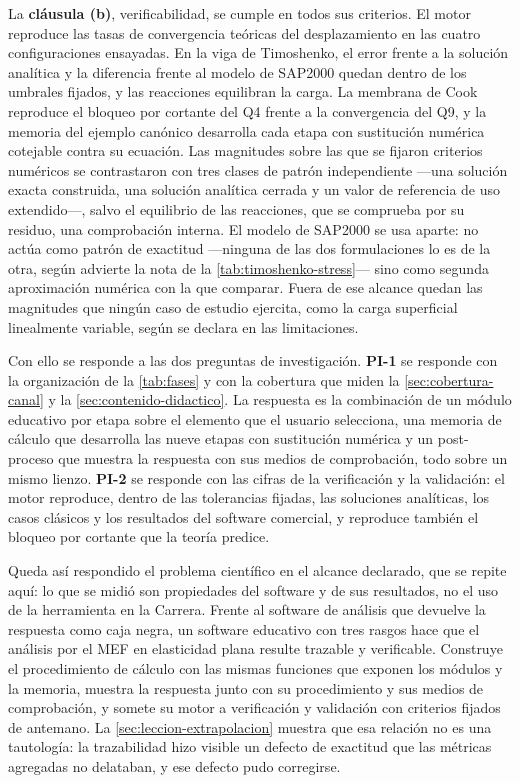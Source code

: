 La \textbf{cláusula (b)}, verificabilidad, se cumple en todos sus criterios. El motor reproduce las tasas de convergencia teóricas del desplazamiento en las cuatro configuraciones ensayadas. En la viga de Timoshenko, el error frente a la solución analítica y la diferencia frente al modelo de SAP2000 quedan dentro de los umbrales fijados, y las reacciones equilibran la carga. La membrana de Cook reproduce el bloqueo por cortante del Q4 frente a la convergencia del Q9, y la memoria del ejemplo canónico desarrolla cada etapa con sustitución numérica cotejable contra su ecuación. Las magnitudes sobre las que se fijaron criterios numéricos se contrastaron con tres clases de patrón independiente ---una solución exacta construida, una solución analítica cerrada y un valor de referencia de uso extendido---, salvo el equilibrio de las reacciones, que se comprueba por su residuo, una comprobación interna. El modelo de SAP2000 se usa aparte: no actúa como patrón de exactitud ---ninguna de las dos formulaciones lo es de la otra, según advierte la nota de la \autoref{tab:timoshenko-stress}--- sino como segunda aproximación numérica con la que comparar. Fuera de ese alcance quedan las magnitudes que ningún caso de estudio ejercita, como la carga superficial linealmente variable, según se declara en las limitaciones.

Con ello se responde a las dos preguntas de investigación. \textbf{PI-1} se responde con la organización de la \autoref{tab:fases} y con la cobertura que miden la \autoref{sec:cobertura-canal} y la \autoref{sec:contenido-didactico}. La respuesta es la combinación de un módulo educativo por etapa sobre el elemento que el usuario selecciona, una memoria de cálculo que desarrolla las nueve etapas con sustitución numérica y un post-proceso que muestra la respuesta con sus medios de comprobación, todo sobre un mismo lienzo. \textbf{PI-2} se responde con las cifras de la verificación y la validación: el motor reproduce, dentro de las tolerancias fijadas, las soluciones analíticas, los casos clásicos y los resultados del software comercial, y reproduce también el bloqueo por cortante que la teoría predice.

Queda así respondido el problema científico en el alcance declarado, que se repite aquí: lo que se midió son propiedades del software y de sus resultados, no el uso de la herramienta en la Carrera. Frente al software de análisis que devuelve la respuesta como caja negra, un software educativo con tres rasgos hace que el análisis por el MEF en elasticidad plana resulte trazable y verificable. Construye el procedimiento de cálculo con las mismas funciones que exponen los módulos y la memoria, muestra la respuesta junto con su procedimiento y sus medios de comprobación, y somete su motor a verificación y validación con criterios fijados de antemano. La \autoref{sec:leccion-extrapolacion} muestra que esa relación no es una tautología: la trazabilidad hizo visible un defecto de exactitud que las métricas agregadas no delataban, y ese defecto pudo corregirse.
